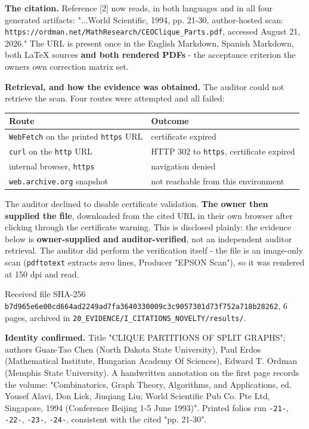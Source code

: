 \documentclass[
  9pt,
  a4paper,
]{article}
\newcounter{none} %
\begin{document}
\textbf{The citation.} Reference {[}2{]} now reads, in both languages
and in all four generated artifacts: "...World Scientific, 1994, pp.
21-30, author-hosted scan:
\texttt{https://ordman.net/MathResearch/CEOClique\_Parts.pdf}, accessed
August 21, 2026." The URL is present once in the English Markdown,
Spanish Markdown, both LaTeX sources \textbf{and both rendered PDFs} -
the acceptance criterion the owner\textquotesingle s own correction
matrix set.

\textbf{Retrieval, and how the evidence was obtained.} The auditor could
not retrieve the scan. Four routes were attempted and all failed:

{\def\LTcaptype{none} %
\begin{longtable}[]{@{}ll@{}}
\toprule\noalign{}
Route & Outcome \\
\midrule\noalign{}
\endhead
\bottomrule\noalign{}
\endlastfoot
\texttt{WebFetch} on the printed \texttt{https} URL & certificate
expired \\
\texttt{curl} on the \texttt{http} URL & HTTP 302 to \texttt{https},
certificate expired \\
internal browser, \texttt{https} & navigation denied \\
\texttt{web.archive.org} snapshot & not reachable from this
environment \\
\end{longtable}
}

The auditor declined to disable certificate validation. \textbf{The
owner then supplied the file}, downloaded from the cited URL in their
own browser after clicking through the certificate warning. This is
disclosed plainly: the evidence below is \textbf{owner-supplied and
auditor-verified}, not an independent auditor retrieval. The auditor did
perform the verification itself - the file is an image-only scan
(\texttt{pdftotext} extracts zero lines, Producer "EPSON Scan"), so it
was rendered at 150 dpi and read.

Received file SHA-256
\texttt{b7d965e6e00cd664ad2249ad7fa3640330009c3c9057301d73f752a718b28262},
6 pages, archived in
\texttt{20\_EVIDENCE/I\_CITATIONS\_NOVELTY/results/}.

\textbf{Identity confirmed.} Title "CLIQUE PARTITIONS OF SPLIT GRAPHS";
authors Guan-Tao Chen (North Dakota State University), Paul Erdos
(Mathematical Institute, Hungarian Academy Of Sciences), Edward T.
Ordman (Memphis State University). A handwritten annotation on the first
page records the volume: "Combinatorics, Graph Theory, Algorithms, and
Applications, ed. Yousef Alavi, Don Lick, Jiuqiang Liu; World Scientific
Pub Co. Pte Ltd, Singapore, 1994 (Conference Beijing 1-5 June 1993)".
Printed folios run \texttt{-21-}, \texttt{-22-}, \texttt{-23-},
\texttt{-24-}, consistent with the cited "pp. 21-30".
\end{document}
